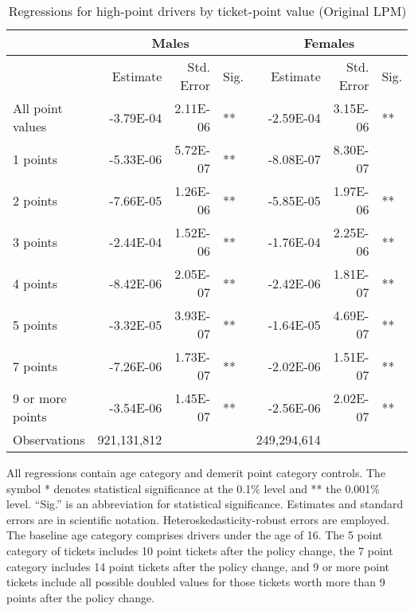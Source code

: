 
\begin{table}%
\centering 
\begin{tabular}{l r r l r r l} 

\hline 
 
 & \multicolumn{3}{c}{Males} & \multicolumn{3}{c}{Females} \\ 

\hline 
 
 & Estimate & Std. Error & Sig. & Estimate & Std. Error & Sig. \\ 

\hline 
 
All point values                &  -3.79E-04        &  2.11E-06       &   **       &  -2.59E-04        &  3.15E-06       &   **       \\ 
1 points                        &  -5.33E-06        &  5.72E-07       &   **       &  -8.08E-07        &  8.30E-07       &            \\ 
2 points                        &  -7.66E-05        &  1.26E-06       &   **       &  -5.85E-05        &  1.97E-06       &   **       \\ 
3 points                        &  -2.44E-04        &  1.52E-06       &   **       &  -1.76E-04        &  2.25E-06       &   **       \\ 
4 points                        &  -8.42E-06        &  2.05E-07       &   **       &  -2.42E-06        &  1.81E-07       &   **       \\ 
5 points                        &  -3.32E-05        &  3.93E-07       &   **       &  -1.64E-05        &  4.69E-07       &   **       \\ 
7 points                        &  -7.26E-06        &  1.73E-07       &   **       &  -2.02E-06        &  1.51E-07       &   **       \\ 
9 or more points                &  -3.54E-06        &  1.45E-07       &   **       &  -2.56E-06        &  2.02E-07       &   **       \\ 
Observations            & 921,131,812    &          &              &  249,294,614 \\ 


\hline 

\end{tabular} 
\caption{Regressions for high-point drivers by ticket-point value (Original LPM)} 
All regressions contain age category and demerit point category controls. 
The symbol * denotes statistical significance at the 0.1\% level 
and ** the 0.001\% level. 
``Sig.'' is an abbreviation for statistical significance. 
Estimates and standard errors are in scientific notation. 
Heteroskedasticity-robust errors are employed. 
The baseline age category comprises drivers under the age of 16. 
The 5 point category of tickets includes 10 point tickets after the policy change,  
the 7 point category includes 14 point tickets after the policy change,  
and 9 or more point tickets include all possible doubled values for those tickets  
worth more than 9 points after the policy change. 
\label{tab:orig_regs_by_points} 
\end{table} 
 
